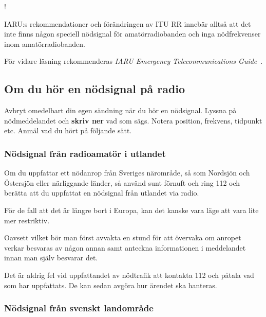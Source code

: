 \begin{center}
\begin{minipage}{0.19\columnwidth}
\Huge{\Huge{\hspace{1ex}!}}
\end{minipage}
\begin{minipage}{0.7\columnwidth}
IARU:s rekommendationer och förändringen av ITU RR innebär alltså att
det inte finns någon speciell nödsignal för amatörradiobanden och inga
nödfrekvenser inom amatörradiobanden.
\end{minipage}
\end{center}

För vidare läsning rekommenderas
\emph{IARU Emergency Telecommunications Guide}~\cite{IARU-ETG}.

\newpage %
\subsection{Om du hör en nödsignal på radio}
\label{hör_nödtrafik}

Avbryt omedelbart din egen sändning när du hör en nödsignal. Lyssna på
nödmeddelandet och \textbf{skriv ner} vad som sägs.
Notera position, frekvens, tidpunkt etc. Anmäl vad du hört på följande sätt.

\subsubsection{Nödsignal från radioamatör i utlandet}

Om du uppfattar ett nödanrop från Sveriges närområde, så som Nordsjön och
Östersjön eller närliggande länder, så använd sunt förnuft och ring 112 och
berätta att du uppfattat en nödsignal från utlandet via radio.

För de fall att det är längre bort i Europa, kan det kanske vara läge att vara
lite mer restriktiv.

Oavsett vilket bör man först avvakta en stund för att övervaka om anropet verkar
besvaras av någon annan samt anteckna informationen i meddelandet innan man
själv besvarar det.

Det är aldrig fel vid uppfattandet av nödtrafik att kontakta 112 och påtala vad
som har uppfattats.
De kan sedan avgöra hur ärendet ska hanteras.

\subsubsection{Nödsignal från svenskt landområde}
\label{sv. nödsignal}

